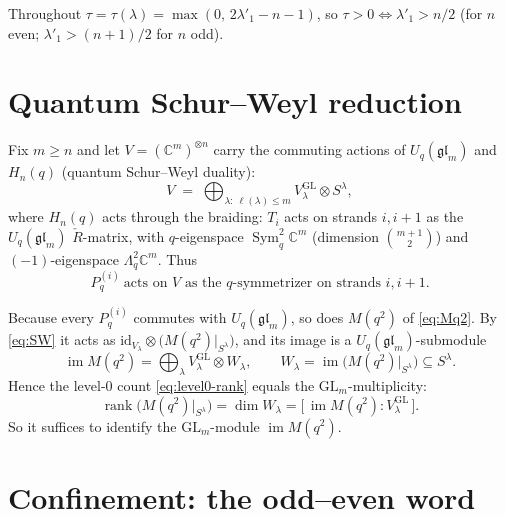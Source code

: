 \documentclass[11pt]{article}
\theoremstyle{definition}
\newcommand{\Sym}{\operatorname{Sym}}
\newcommand{\im}{\operatorname{im}}
\newcommand{\rank}{\operatorname{rank}}
\newcommand{\GL}{\mathrm{GL}}
\newcommand{\C}{\mathbb{C}}
\newcommand{\la}{\lambda}
\newcommand{\Rh}{\check{R}}
\begin{document}
Throughout $\tau=\tau(\la)=\max(0,\,2\la'_1-n-1)$, so $\tau>0\iff\la'_1>n/2$ (for
$n$ even; $\la'_1>(n+1)/2$ for $n$ odd).

\section{Quantum Schur--Weyl reduction}

Fix $m\ge n$ and let $V=(\C^m)^{\otimes n}$ carry the commuting actions of
$U_q(\mathfrak{gl}_m)$ and $H_n(q)$ (quantum Schur--Weyl duality):
\begin{equation}\label{eq:SW}
   V \;=\; \bigoplus_{\la:\ \ell(\la)\le m} V_\la^{\GL}\otimes S^\la ,
\end{equation}
where $H_n(q)$ acts through the braiding: $T_i$ acts on strands $i,i+1$ as the
$U_q(\mathfrak{gl}_m)$ $\Rh$-matrix, with $q$-eigenspace $\Sym^2_q\C^m$ (dimension
$\binom{m+1}2$) and $(-1)$-eigenspace $\Lambda^2_q\C^m$.  Thus
\begin{equation}\label{eq:Pq-sym}
   P_q^{(i)} \ \text{acts on $V$ as the $q$-symmetrizer on strands }i,i+1 .
\end{equation}

Because every $P_q^{(i)}$ commutes with $U_q(\mathfrak{gl}_m)$, so does
$M(q^2)$ of \eqref{eq:Mq2}.  By \eqref{eq:SW} it acts as
$\mathrm{id}_{V_\la}\otimes\bigl(M(q^2)|_{S^\la}\bigr)$, and its image is a
$U_q(\mathfrak{gl}_m)$-submodule
\[
   \im M(q^2)=\bigoplus_\la V_\la^{\GL}\otimes W_\la,\qquad
   W_\la=\im\bigl(M(q^2)|_{S^\la}\bigr)\subseteq S^\la .
\]
Hence the level-$0$ count \eqref{eq:level0-rank} equals the $\GL_m$-multiplicity:
\begin{equation}\label{eq:rank-is-mult}
   \rank\bigl(M(q^2)|_{S^\la}\bigr)=\dim W_\la
      =\bigl[\,\im M(q^2):V_\la^{\GL}\,\bigr].
\end{equation}
So it suffices to identify the $\GL_m$-module $\im M(q^2)$.

\section{Confinement: the odd--even word}
\end{document}
